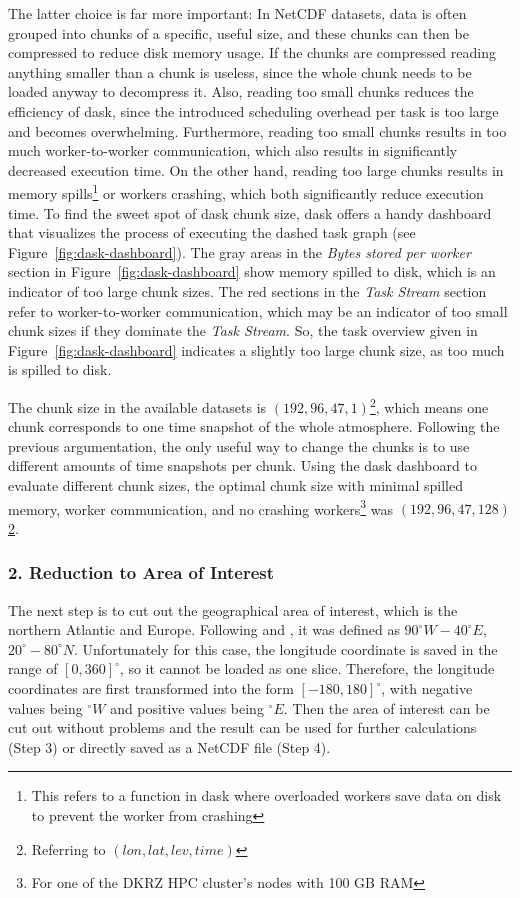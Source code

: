 The latter choice is far more important: 
In NetCDF datasets, data is often grouped into chunks of a specific, useful size, and these chunks can then be compressed to reduce disk memory usage. 
If the chunks are compressed reading anything smaller than a chunk is useless, since the whole chunk needs to be loaded anyway to decompress it. 
Also, reading too small chunks reduces the efficiency of dask, since the introduced scheduling overhead per task is too large and becomes overwhelming.
Furthermore, reading too small chunks results in too much worker-to-worker communication, which also results in significantly decreased execution time. 
On the other hand, reading too large chunks results in memory spills\footnote{This refers to a function in dask where overloaded workers save data on disk to prevent the worker from crashing} or workers crashing, which both significantly reduce execution time. 
To find the sweet spot of dask chunk size, dask offers a handy dashboard that visualizes the process of executing the dashed task graph (see Figure~\ref{fig:dask-dashboard}). 
The gray areas in the \textit{Bytes stored per worker} section in Figure~\ref{fig:dask-dashboard} show memory spilled to disk, which is an indicator of too large chunk sizes. 
The red sections in the \textit{Task Stream} section refer to worker-to-worker communication, which may be an indicator of too small chunk sizes if they dominate the \textit{Task Stream}. 
So, the task overview given in Figure~\ref{fig:dask-dashboard} indicates a slightly too large chunk size, as too much is spilled to disk. \cite{buckley_choosing_nodate}

The chunk size in the available datasets is $(192, 96, 47, 1)$\footnote{\label{vardims}Referring to $(lon, lat, lev, time)$}, which means one chunk corresponds to one time snapshot of the whole atmosphere.
Following the previous argumentation, the only useful way to change the chunks is to use different amounts of time snapshots per chunk.
Using the dask dashboard to evaluate different chunk sizes, the optimal chunk size with minimal spilled memory, worker communication, and no crashing workers\footnote{For one of the DKRZ HPC cluster's nodes with 100 GB RAM} was $(192, 96, 47, 128)$\cref{vardims}.  


\subsubsection{2. Reduction to Area of Interest}

The next step is to cut out the geographical area of interest, which is the northern Atlantic and Europe. 
Following \cite{vietinghoff_visual_2021} and \cite{hurrell_overview_2003}, it was defined as $90^\circ W - 40^\circ E$, $20^\circ - 80^\circ N$.
Unfortunately for this case, the longitude coordinate is saved in the range of $[0,360]^\circ$, so it cannot be loaded as one slice. 
Therefore, the longitude coordinates are first transformed into the form $[-180, 180]^\circ$, with negative values being $^\circ W$ and positive values being $^\circ E$. 
Then the area of interest can be cut out without problems and the result can be used for further calculations (Step 3) or directly saved as a NetCDF file (Step 4). 

